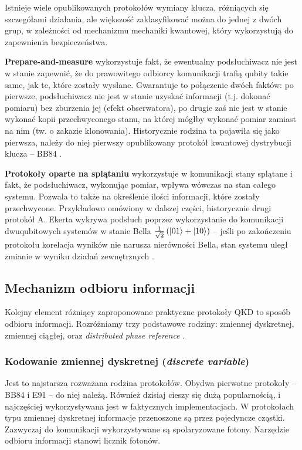\documentclass[10pt]{article}
\begin{document}
Istnieje wiele opublikowanych protokołów wymiany klucza, różniących się szczegółami działania, ale
większość zaklasyfikować można do jednej z dwóch grup, w zależności od mechanizmu mechaniki
kwantowej, który wykorzystują do zapewnienia bezpieczeństwa.

\textbf{Prepare-and-measure} wykorzystuje fakt, że ewentualny podsłuchiwacz nie jest w stanie zapewnić,
że do prawowitego odbiorcy komunikacji trafią qubity takie same, jak te, które zostały wysłane.
Gwarantuje to połączenie dwóch faktów: po pierwsze, podsłuchiwacz nie jest w stanie uzyskać informacji
(t.j. dokonać pomiaru) bez zburzenia jej (efekt obserwatora), po drugie zaś nie jest w stanie wykonać
kopii przechwyconego stanu, na której mógłby wykonać pomiar zamiast na nim (tw. o zakazie klonowania).
Historycznie rodzina ta pojawiła się jako pierwsza, należy do niej pierwszy opublikowany protokół
kwantowej dystrybucji klucza -- BB84 \cite{bb84,Scarani09}.

\textbf{Protokoły oparte na splątaniu} wykorzystuje w komunikacji stany splątane i fakt, że 
podsłuchiwacz, wykonując pomiar, wpływa wówczas na stan całego systemu. Pozwala to także na określenie
ilości informacji, które zostały przechwycone. Przykładowo omówiony w dalszej części, historycznie
drugi protokół A. Ekerta wykrywa podsłuch poprzez wykorzystanie do komunikacji dwuqubitowych systemów
w stanie Bella \(\frac{1}{\sqrt{2}}\left(\Ket{01}+\Ket{10}\right)\) -- jeśli po zakończeniu protokołu
korelacja wyników nie narusza nierówności Bella, stan systemu uległ zmianie w wyniku działań
zewnętrznych \cite{Ekert91,Ekert12}.

\subsection{Mechanizm odbioru informacji}

Kolejny element różniący zaproponowane praktyczne protokoły QKD to sposób odbioru informacji.
Rozróżniamy trzy podstawowe rodziny: zmiennej dyskretnej, zmiennej ciągłej, oraz \emph{distributed
phase reference} \cite{Scarani09}.

\subsubsection*{Kodowanie zmiennej dyskretnej (\emph{discrete variable})}

Jest to najstarsza rozważana rodzina protokołów. Obydwa pierwotne protokoły -- BB84 i E91 -- do niej 
należą. Również dzisiaj cieszy się dużą popularnością, i najczęściej wykorzystywana jest w faktycznych
implementacjach. W protokołach typu zmiennej dyskretnej informacje przenoszone są przez pojedyncze 
cząstki. Zazwyczaj do komunikacji wykorzystywane są spolaryzowane fotony. Narzędzie odbioru informacji
stanowi licznik fotonów.
\end{document}
